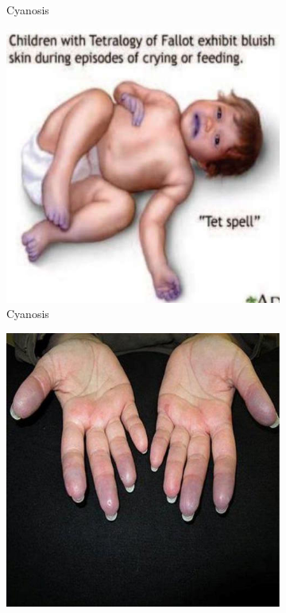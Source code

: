\documentclass[a4paper,12pt]{book}
\begin{document}
{\begin{figure}[h]
\begin{subfigure}[t]{.23\textwidth}
																	\caption{Cyanosis}
																	\label{cyanosis1}
																\end{subfigure}
																\hspace{\fill}
																\begin{subfigure}[t]{.23\textwidth}
																	\centering
																	\includegraphics[width=\textwidth]{./clinicalPhysioPic/cyanosis4-1.jpg}
																	\caption{Cyanosis}
																	\label{cyanosis2}
																\end{subfigure}
																\hspace{\fill}
																\begin{subfigure}[t]{.23\textwidth}
																	\centering
																	\includegraphics[width=\textwidth]{./clinicalPhysioPic/cyanosis4-2.jpg}

\end{subfigure}
\end{figure}}
\end{document}
